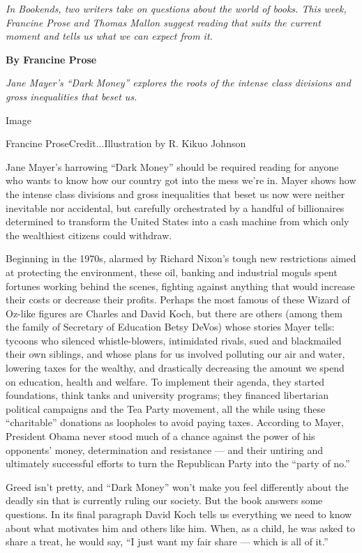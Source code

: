 \emph{In Bookends, two writers take on questions about the world of
books. This week, Francine Prose and Thomas Mallon suggest reading that
suits the current moment and tells us what we can expect from it.}

\textbf{By Francine Prose}

\emph{Jane Mayer's ``Dark Money'' explores the roots of the intense
class divisions and gross inequalities that beset us.}

Image

Francine ProseCredit...Illustration by R. Kikuo Johnson

Jane Mayer's harrowing ``Dark Money'' should be required reading for
anyone who wants to know how our country got into the mess we're in.
Mayer shows how the intense class divisions and gross inequalities that
beset us now were neither inevitable nor accidental, but carefully
orchestrated by a handful of billionaires determined to transform the
United States into a cash machine from which only the wealthiest
citizens could withdraw.

Beginning in the 1970s, alarmed by Richard Nixon's tough new
restrictions aimed at protecting the environment, these oil, banking and
industrial moguls spent fortunes working behind the scenes, fighting
against anything that would increase their costs or decrease their
profits. Perhaps the most famous of these Wizard of Oz-like figures are
Charles and David Koch, but there are others (among them the family of
Secretary of Education Betsy DeVos) whose stories Mayer tells: tycoons
who silenced whistle-blowers, intimidated rivals, sued and blackmailed
their own siblings, and whose plans for us involved polluting our air
and water, lowering taxes for the wealthy, and drastically decreasing
the amount we spend on education, health and welfare. To implement their
agenda, they started foundations, think tanks and university programs;
they financed libertarian political campaigns and the Tea Party
movement, all the while using these ``charitable'' donations as
loopholes to avoid paying taxes. According to Mayer, President Obama
never stood much of a chance against the power of his opponents' money,
determination and resistance --- and their untiring and ultimately
successful efforts to turn the Republican Party into the ``party of
no.''

Greed isn't pretty, and ``Dark Money'' won't make you feel differently
about the deadly sin that is currently ruling our society. But the book
answers some questions. In its final paragraph David Koch tells us
everything we need to know about what motivates him and others like him.
When, as a child, he was asked to share a treat, he would say, ``I just
want my fair share --- which is all of it.''

